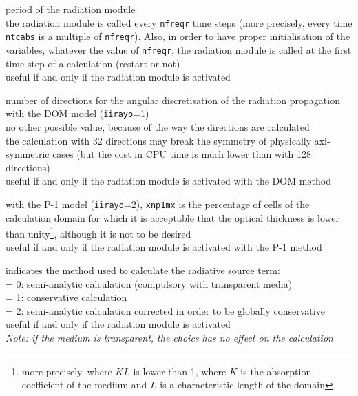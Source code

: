 {period of the radiation module\\
the radiation module is called every {\tt nfreqr} time steps (more precisely,
every time {\tt ntcabs} is a multiple of {\tt nfreqr}). Also, in order to
have proper initialisation of the variables, whatever the value of {\tt nfreqr},
the radiation module is called at the first time step of a calculation
(restart or not)\\
useful if and only if the radiation module is activated}

{number of directions for the angular discretisation of the radiation
propagation with the DOM model ({\tt iirayo}=1)\\
no other possible value, because of the way the directions are calculated\\
the calculation with 32 directions may break the symmetry of
physically axi-symmetric cases (but the cost in CPU time is much lower
 than with 128 directions)\\
useful if and only if the radiation module is activated with the DOM method}

{with the P-1 model ({\tt iirayo}=2), {\tt xnp1mx} is the percentage of cells of
the calculation domain for which it is acceptable that the optical
thickness is lower than unity\footnote{more precisely, where $KL$ is lower than
1, where $K$ is the absorption coefficient of the medium and $L$ is a
characteristic length of the domain}, although it is not to be desired\\
useful if and only if the radiation module is activated with the P-1 method}

{indicates the method used to calculate the radiative source term:\\
\hspace*{1.3cm}= 0: semi-analytic calculation (compulsory with transparent
media)\\
\hspace*{1.3cm}= 1: conservative calculation\\
\hspace*{1.3cm}= 2: semi-analytic calculation corrected in order to be
globally conservative\\
useful if and only if the radiation module is activated\\
{\em Note: if the medium is transparent, the choice has no effect on the calculation}}

